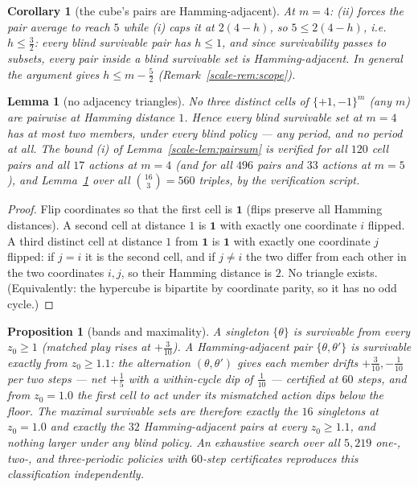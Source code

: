 \documentclass[10pt,twocolumn]{article}
\theoremstyle{plain}
\newtheorem{proposition}[theorem]{Proposition}
\newtheorem{lemma}[theorem]{Lemma}
\newtheorem{corollary}[theorem]{Corollary}
\theoremstyle{definition}
\theoremstyle{remark}
\begin{document}
\begin{corollary}[the cube's pairs are Hamming-adjacent]
\label{scale-cor:hamming}
At \(m = 4\): (ii) forces the pair average to reach \(5\) while (i)
caps it at \(2(4 - h)\), so \(5 \le 2(4 - h)\), i.e.\
\(h \le \tfrac32\): every blind survivable pair has \(h \le 1\),
and since survivability passes to subsets, every pair inside a blind
survivable set is Hamming-adjacent. In general the argument gives
\(h \le m - \tfrac52\) (Remark~\ref{scale-rem:scope}).
\end{corollary}

\begin{lemma}[no adjacency triangles]\label{scale-lem:triangle}
No three distinct cells of \(\{+1,-1\}^{m}\) (any \(m\)) are
pairwise at Hamming distance \(1\). Hence every blind survivable set
at \(m = 4\) has at most two members, under every blind policy ---
any period, and no period at all. The bound (i) of
Lemma~\ref{scale-lem:pairsum} is verified for all \(120\) cell pairs and
all \(17\) actions at \(m = 4\) (and for all \(496\) pairs and
\(33\) actions at \(m = 5\)), and
Lemma~\ref{scale-lem:triangle} over all \(\binom{16}{3} = 560\) triples, by the verification script.
\end{lemma}

\begin{proof}
Flip coordinates so that the first cell is \(\mathbf{1}\) (flips
preserve all Hamming distances). A second cell at distance \(1\) is
\(\mathbf{1}\) with exactly one coordinate \(i\) flipped. A third
distinct cell at distance \(1\) from \(\mathbf{1}\) is
\(\mathbf{1}\) with exactly one coordinate \(j\) flipped: if
\(j = i\) it is the second cell, and if \(j \neq i\) the two differ
from each other in the two coordinates \(i, j\), so their Hamming
distance is \(2\). No triangle exists. (Equivalently: the hypercube
is bipartite by coordinate parity, so it has no odd cycle.)
\end{proof}

\begin{proposition}[bands and maximality]\label{scale-prop:bands}
A singleton \(\{\theta\}\) is survivable from every \(z_{0} \ge 1\)
(matched play rises at \(+\tfrac3{10}\)). A Hamming-adjacent pair
\(\{\theta, \theta'\}\) is survivable exactly from
\(z_{0} \ge 1.1\): the alternation \((\theta, \theta')\) gives each
member drifts \(+\tfrac3{10}, -\tfrac1{10}\) per two steps --- net
\(+\tfrac15\) with a within-cycle dip of \(\tfrac1{10}\) --- certified
at \(60\) steps, and from \(z_{0} = 1.0\) the first cell to act under
its mismatched action dips below the floor. The maximal survivable
sets are therefore exactly the \(16\) singletons at \(z_{0} = 1.0\)
and exactly the \(32\) Hamming-adjacent pairs at every
\(z_{0} \ge 1.1\), and nothing larger under any blind policy. An
exhaustive search over all \(5{,}219\) one-, two-, and three-periodic
policies with \(60\)-step certificates reproduces this classification
independently.
\end{proposition}
\end{document}
